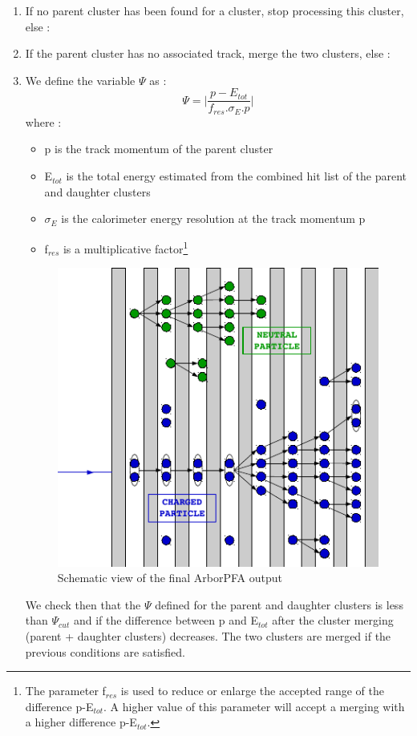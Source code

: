 \documentclass[cits]{JINST}
\begin{document}
\begin{enumerate}
  \item If no parent cluster has been found for a cluster, stop processing this cluster, else :
  \item If the parent cluster has no associated track, merge the two clusters, else :
  \item We define the variable $\Psi$ as :
  \begin{equation}
    \label{PSI2_ALGORITHM_EQUATION}
    \Psi = \Big| \frac{p-E_{tot}}{f_{res} . \sigma_E . p} \Big|
  \end{equation}
  where :
  \begin{itemize}
    \item p is the track momentum of the parent cluster
    \item E$_{tot}$ is the total energy estimated from the combined hit list of the parent and daughter clusters
    \item $\sigma_E$ is the calorimeter energy resolution at the track momentum p 
    \item f$_{res}$ is a multiplicative factor\footnote{The parameter f$_{res}$ is used to reduce or enlarge the accepted range of the difference p-E$_{tot}$. A higher value of this parameter will accept a merging with a higher difference p-E$_{tot}$.}
  \end{itemize}
  
\begin{figure}[!h]
  \begin{center}
    \includegraphics[width=0.4\linewidth]{PfoCreation.pdf}
  \end{center}
  \caption{\label{ARBOR_PFO_CREATION} Schematic view of the final ArborPFA output}
\end{figure}

We check then that the $\Psi$ defined for the parent and daughter clusters is less than $\Psi_{cut}$ and if the difference between p and E$_{tot}$ after the cluster merging (parent + daughter clusters) decreases. The two clusters are merged if the previous conditions are satisfied.

\end{enumerate}
\end{document}
